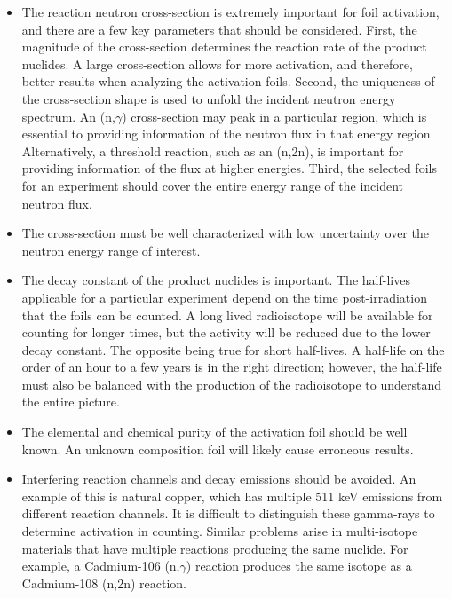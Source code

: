 \begin{itemize}
	\item The reaction neutron cross-section is extremely important for foil 
	activation, and there are a few key parameters that should be considered. 
	First, the magnitude of the cross-section determines the 
	reaction rate of the product nuclides. A large cross-section allows for 
	more activation, and therefore, better results when analyzing the activation 
	foils. Second, the uniqueness of the cross-section shape is used to unfold 
	the incident neutron energy spectrum. An (n,$\gamma$) cross-section may 
	peak 
	in a particular region, which is essential to providing information of the 
	neutron flux in that energy region. Alternatively, a threshold reaction, 
	such as an (n,2n), is important for providing information of the flux at 
	higher energies. Third, the selected foils for an experiment should cover  
	the entire energy range of the incident neutron flux. 
    
    \item The cross-section must be well characterized with low uncertainty over the neutron energy range of interest.   
    
    \item The decay constant of the product nuclides is important. The 
    half-lives applicable for a particular experiment depend on the time 
    post-irradiation that the foils can be counted. A long lived radioisotope 
    will be available for counting for longer times, but the activity will be reduced due to the lower decay constant. The opposite being true for short 
    half-lives. A half-life on the order of an hour to a few years is in the 
    right direction; however, the half-life must also be balanced with the 
    production of the radioisotope to understand the entire picture. 
    
    \item The elemental and chemical purity of the activation foil should be 
    well known. An unknown composition foil will likely cause erroneous 
    results. 
    
    \item Interfering reaction channels and decay emissions should be avoided. 
    An example of this is natural copper, which has multiple 511 keV emissions 
    from different reaction channels. It is difficult to distinguish these 
    gamma-rays to determine activation in counting. Similar problems arise in 
    multi-isotope materials that have multiple reactions producing the same 
    nuclide. For example, a Cadmium-106 (n,$\gamma$) reaction produces the same 
    isotope as a Cadmium-108 (n,2n) reaction. 


\end{itemize}
